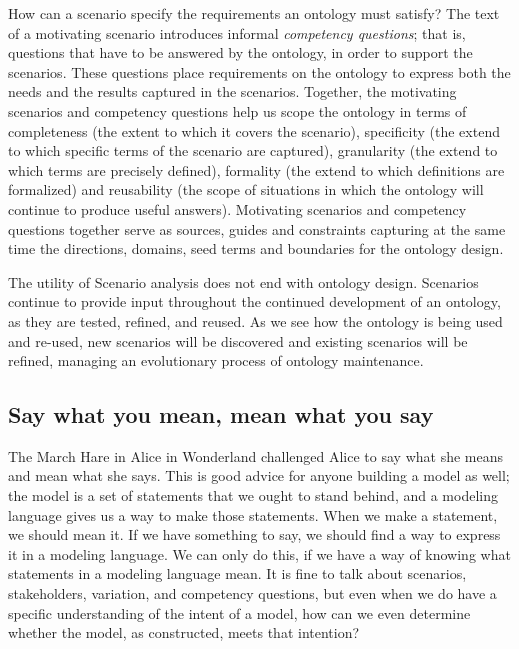How can a scenario specify the requirements an ontology must satisfy?  The text of a 
motivating scenario introduces informal \emph{competency questions}; that is, questions 
that have to be answered by the ontology, in order to support the scenarios. 
These questions
place  requirements on the ontology to express both the needs and the results 
captured in the scenarios. Together, the motivating scenarios and competency 
questions help 
us scope the ontology in terms of completeness (the extent to which it covers the 
scenario), specificity (the extend to which specific terms of the scenario are captured), 
granularity (the extend to which terms are precisely defined), formality (the extend to 
which definitions are formalized) and reusability (the scope of situations in which the
ontology will continue to produce useful answers). 
Motivating scenarios and competency questions together  serve as 
sources, guides and constraints capturing at the same time the directions, domains, seed 
terms and boundaries for the ontology design. 

The utility of Scenario 
analysis does not end with ontology design.  Scenarios continue to provide input 
throughout the continued development of an ontology, as they are tested, refined, 
and reused. As we see how the ontology is being used and re-used, new scenarios will 
be discovered  
and existing scenarios will  be refined, managing an evolutionary process of
ontology maintenance. 



\subsection{Say what you mean, mean what you say}
\label{ch15:swym}
The March Hare in Alice in Wonderland challenged Alice to say what she
means and mean what she says. This is good advice for anyone building a
model as well; the model is a set of statements that we ought to stand
behind, and a modeling language gives us a way to make those statements.
When we make a statement, we should mean it. If we have something to
say, we should find a way to express it in a modeling language. We can
only do this, if we have a way of knowing what statements in a modeling
language mean. It is fine to talk about scenarios,  stakeholders, variation, and
competency questions, but even when we do have a specific understanding
of the intent of a model, how can we even determine whether the model,
as constructed, meets that intention?

